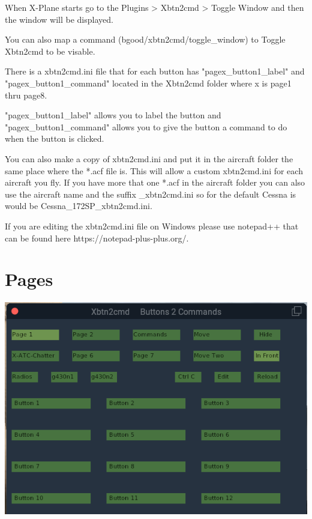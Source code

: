 \documentclass[11pt,parskip=half,a4paper]{scrartcl}
\begin{document}
When X-Plane starts go to the Plugins > Xbtn2cmd > Toggle Window and then the window will be displayed. \newline

You can also map a command (bgood/xbtn2cmd/toggle\_window) to Toggle Xbtn2cmd to be visable. \newline

There is a xbtn2cmd.ini file that for each button has "pagex\_button1\_label" and "pagex\_button1\_command" located in the Xbtn2cmd folder where x is page1 thru page8. \newline

"pagex\_button1\_label" allows you to label the button and "pagex\_button1\_command" allows you to give the button a command to do when the button is clicked. \newline

You can also make a copy of xbtn2cmd.ini and put it in the aircraft folder the same place where the *.acf file is. This will allow a custom xbtn2cmd.ini for each aircraft you fly. If you have more that one *.acf in the aircraft folder you can also use the aircraft name and the suffix \_xbtn2cmd.ini so for the default Cessna is would be Cessna\_172SP\_xbtn2cmd.ini. \newline

If you are editing the xbtn2cmd.ini file on Windows please use notepad++ that can be found here https://notepad-plus-plus.org/.

\section{Pages}

\begin{center}
\includegraphics[width=15cm]{Xbtn2cmd_Page1.png}
\end{center}
\end{document}
